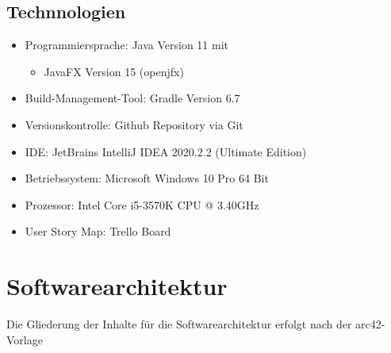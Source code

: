 \documentclass[11pt]{article}
\begin{document}
    \subsection{Technnologien}
    \begin{itemize}
        \item Programmiersprache: Java Version 11 mit
        \begin{itemize}
            \item JavaFX Version 15 (openjfx)
        \end{itemize}
        \item Build-Management-Tool: Gradle\cite{gradle} Version 6.7
        \item Versionskontrolle: Github Repository\cite{github} via Git\cite{git}
        \item IDE: JetBrains IntelliJ IDEA\cite{idea} 2020.2.2 (Ultimate Edition)
        \item Betriebssystem: Microsoft Windows 10 Pro 64 Bit
        \item Prozessor: Intel Core i5-3570K CPU @ 3.40GHz
        \item User Story Map: Trello Board\cite{trello}
    \end{itemize}

    \newpage

    \section{Softwarearchitektur}
    Die Gliederung der Inhalte für die Softwarearchitektur erfolgt nach der arc42-Vorlage~\cite{arc42}
\end{document}
